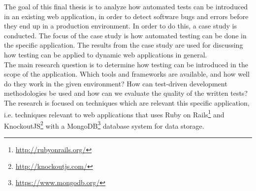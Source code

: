 
The goal of this final thesis is to analyze how automated tests can be
introduced in an existing web application, in order to detect software
bugs and errors before they end up in a production environment. In order
to do this, a case study is conducted. The focus of the case study is
how automated testing can be done in the specific application. The
results from the case study are used for discussing how testing can be
applied to dynamic web applications in general.\\

The main research question is to determine how testing can be introduced
in the scope of the application. Which tools and frameworks are
available, and how well do they work in the given environment? How can
test-driven development methodologies be used and how can we evaluate
the quality of the written tests? The research is focused on techniques
which are relevant this specific application, i.e. techniques relevant
to web applications that uses Ruby on
Rails\footnote{\url{http://rubyonrails.org/}} and
KnockoutJS\footnote{\url{http://knockoutjs.com/}} with a
MongoDB\footnote{\url{https://www.mongodb.org/}} database system for
data storage.\\
